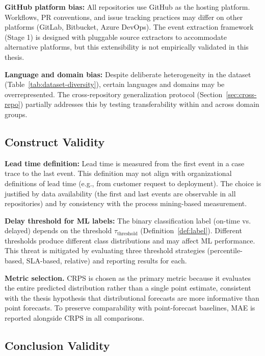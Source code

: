 \textbf{GitHub platform bias:} All repositories use GitHub as the 
hosting platform. Workflows, PR conventions, and issue tracking 
practices may differ on other platforms (GitLab, Bitbucket, Azure 
DevOps). The event extraction framework (Stage 1) is designed with 
pluggable source extractors to accommodate alternative platforms, 
but this extensibility is not empirically validated in this thesis.

\textbf{Language and domain bias:} Despite deliberate heterogeneity in 
the dataset (Table~\ref{tab:dataset-diversity}), certain languages and 
domains may be overrepresented. The cross-repository generalization 
protocol (Section~\ref{sec:cross-repo}) partially addresses this by 
testing transferability within and across domain groups.


\subsection{Construct Validity}
\label{sec:threats-construct}

\textbf{Lead time definition:} Lead time is measured from the first 
event in a case trace to the last event. This definition may not align 
with organizational definitions of lead time (e.g., from customer 
request to deployment). The choice is justified by data availability 
(the first and last events are observable in all repositories) and 
by consistency with the process mining-based measurement.

\textbf{Delay threshold for ML labels:} The binary classification label 
(on-time vs. delayed) depends on the threshold $\tau_{\text{threshold}}$ 
(Definition~\ref{def:label}). Different thresholds produce different 
class distributions and may affect ML performance. This threat is 
mitigated by evaluating three threshold strategies (percentile-based, 
SLA-based, relative) and reporting results for each.

\textbf{Metric selection.} CRPS is chosen as the primary metric because
it evaluates the entire predicted distribution rather than a single
point estimate, consistent with the thesis hypothesis that distributional
forecasts are more informative than point forecasts. To preserve
comparability with point-forecast baselines, MAE is reported alongside
CRPS in all comparisons.



\subsection{Conclusion Validity}
\label{sec:threats-conclusion}

